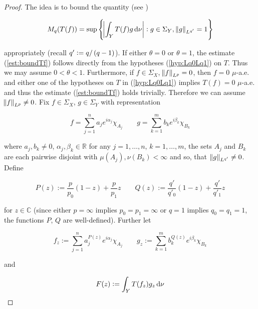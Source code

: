 \begin{proof}
	The idea is to bound the quantity (see \cite[189]{folland:real_analysis:1999})
	
	\begin{equation*}
		M_q( T(f)) = \sup\cbr{\abs{ \int_Y T(f)g \d \nu} : g \in \Sigma_Y, \norm[0]{ g}_{L^{q'}} = 1}
	\end{equation*}

	\noindent appropriately (recall $q' := q/\del[0]{ q - 1 }$). If either $\theta = 0$ or $\theta = 1$, the estimate (\ref{est:boundTf}) follows directly from the hypotheses (\ref{hyp:Lq0Lq1}) on $T$. Thus we may assume \underline{$0 < \theta < 1$}. Furthermore, if $f \in \Sigma_X$, $\norm{ f}_{L^p} = 0$, then $f = 0$ $\mu$-a.e. and either one of the hypotheses on $T$ in (\ref{hyp:Lq0Lq1}) implies $T(f) = 0$ $\mu$-a.e. and thus the estimate (\ref{est:boundTf}) holds trivially. Therefore we can assume \underline{$\norm{f}_{L^p} \neq 0$}. Fix $f \in \Sigma_X$, $g \in \Sigma_Y$ with representation
	
\begin{equation*}
	f = \sum_{j = 1}^n a_j e^{i\alpha_j}\chi_{A_j} \qquad g = \sum_{k = 1}^m b_k e^{i\beta_k}\chi_{B_k}
\end{equation*}

\noindent where $a_j,b_k \neq 0$, $\alpha_j,\beta_k \in \mathbb{R}$ for any $j = 1,\dots,n$, $k = 1,\dots,m$, the sets $A_j$ and $B_k$ are each pairwise disjoint with $\mu( A_j),\nu(B_k) < \infty$ and so, that $\norm[0]{g}_{L^{q'}} \neq 0$. Define

\begin{equation*}
	P(z) := \frac{p}{p_0}(1 - z) + \frac{p}{p_1}z \qquad Q(z) := \frac{q'}{q'_0}(1 - z) + \frac{q'}{q'_1}z
\end{equation*}

\noindent for $z \in \mathbb{C}$ (since either $p = \infty$ implies $p_0 = p_1 = \infty$ or $q = 1$ implies $q_0 = q_1 = 1$, the functions $P$, $Q$ are well-defined). Further let
				
\begin{equation}
	f_z := \sum_{j = 1}^n a^{P(z)}_j e^{i\alpha_j}\chi_{A_j} \qquad g_z :=  \sum_{k = 1}^m b^{Q(z)}_k e^{i\beta_k}\chi_{B_k}
	\label{eq:def_fzgz}
\end{equation}
				
\noindent and 

\begin{equation}
	F(z) := \int_Y T(f_z)g_z\mathop{}\!\mathrm{d}\nu
	\label{eq:def_F}
\end{equation}


\end{proof}
